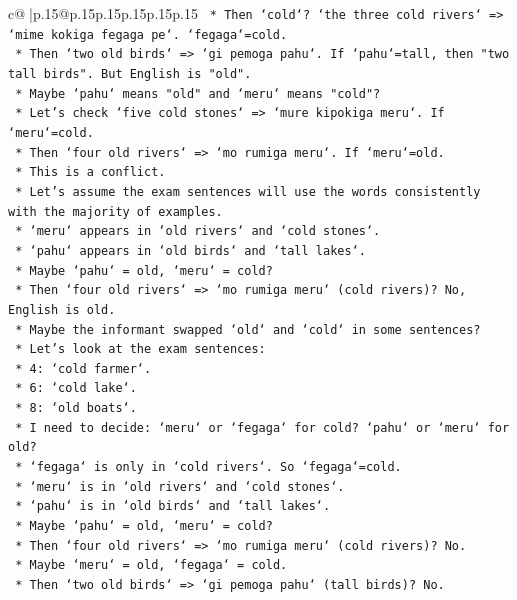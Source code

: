 \documentclass{article}
\begin{document}
{\begin{supertabular}{c@{$\;$}|p{.15\linewidth}@{}p{.15\linewidth}p{.15\linewidth}p{.15\linewidth}p{.15\linewidth}p{.15\linewidth}}
{{{\texttt{    *   Then `cold`? `the three cold rivers` => `mime kokiga fegaga pe`. `fegaga`=cold.} \\
\texttt{    *   Then `two old birds` => `gi pemoga pahu`. If `pahu`=tall, then "two tall birds". But English is "old".} \\
\texttt{    *   Maybe `pahu` means "old" and `meru` means "cold"?} \\
\texttt{    *   Let's check `five cold stones` => `mure kipokiga meru`. If `meru`=cold.} \\
\texttt{    *   Then `four old rivers` => `mo rumiga meru`. If `meru`=old.} \\
\texttt{    *   This is a conflict.} \\
\texttt{    *   Let's assume the exam sentences will use the words consistently with the majority of examples.} \\
\texttt{    *   `meru` appears in `old rivers` and `cold stones`.} \\
\texttt{    *   `pahu` appears in `old birds` and `tall lakes`.} \\
\texttt{    *   Maybe `pahu` = old, `meru` = cold?} \\
\texttt{    *   Then `four old rivers` => `mo rumiga meru` (cold rivers)? No, English is old.} \\
\texttt{    *   Maybe the informant swapped `old` and `cold` in some sentences?} \\
\texttt{    *   Let's look at the exam sentences:} \\
\texttt{        *   4: `cold farmer`.} \\
\texttt{        *   6: `cold lake`.} \\
\texttt{        *   8: `old boats`.} \\
\texttt{    *   I need to decide: `meru` or `fegaga` for cold? `pahu` or `meru` for old?} \\
\texttt{    *   `fegaga` is only in `cold rivers`. So `fegaga`=cold.} \\
\texttt{    *   `meru` is in `old rivers` and `cold stones`.} \\
\texttt{    *   `pahu` is in `old birds` and `tall lakes`.} \\
\texttt{    *   Maybe `pahu` = old, `meru` = cold?} \\
\texttt{    *   Then `four old rivers` => `mo rumiga meru` (cold rivers)? No.} \\
\texttt{    *   Maybe `meru` = old, `fegaga` = cold.} \\
\texttt{    *   Then `two old birds` => `gi pemoga pahu` (tall birds)? No.} \\
}}}
\end{supertabular}}
\end{document}
